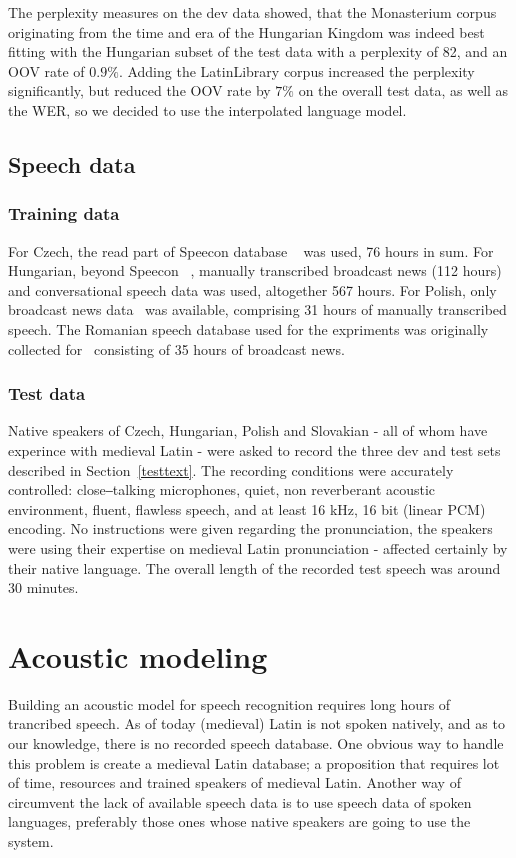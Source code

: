 \documentclass[runningheads,a4paper]{llncs}
\begin{document}
The perplexity measures on the dev data showed, that the Monasterium corpus originating from the time and era of the Hungarian Kingdom was indeed best fitting with the Hungarian subset of the test data with a perplexity of 82, and an OOV rate of $0.9\%$.
Adding the LatinLibrary corpus increased the perplexity significantly, but reduced the OOV rate by $7\%$ on the overall test data, as well as the WER, so we decided to use the interpolated language model.

\subsection{Speech data}
\subsubsection{Training data}
For Czech, the read part of Speecon database ~\cite{czech} was used, 76 hours in sum. For Hungarian, beyond Speecon ~\cite{hungarian}, manually transcribed broadcast news (112 hours) and conversational speech data was used, altogether 567 hours.
For Polish, only broadcast news data~\cite{romanian} was available, comprising 31 hours of manually transcribed speech.
The Romanian speech database used for the expriments was originally collected for~\cite{romanian} consisting of 35 hours of broadcast news.
\subsubsection{Test data}
Native speakers of Czech, Hungarian, Polish and Slovakian - all of whom have experince with medieval Latin - were asked to record the three dev and test sets described in Section~\ref{testtext}.
The recording conditions were accurately controlled: close‒talking microphones, quiet, non reverberant acoustic environment, fluent, flawless speech, and at least 16 kHz, 16 bit (linear PCM) encoding.
No instructions were given regarding the pronunciation, the speakers were using their expertise on medieval Latin pronunciation - affected certainly by their native language.
The overall length of the recorded test speech was around 30 minutes.

\section{Acoustic modeling}\label{AM}
Building an acoustic model for speech recognition requires long hours of trancribed speech.
As of today (medieval) Latin is not spoken natively, and as to our knowledge, there is no recorded speech database.
One obvious way to handle this problem is create a medieval Latin database; a proposition that requires lot of time, resources and trained speakers of medieval Latin. 
Another way of circumvent the lack of available speech data is to use speech data of spoken languages, preferably those ones whose native speakers are going to use the system. 
\end{document}
